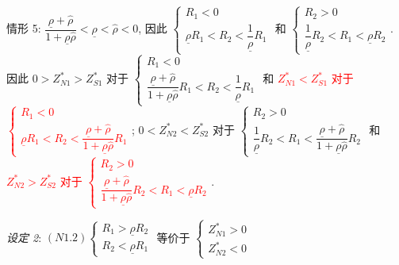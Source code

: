 \documentclass[10.0pt]{article}
\newcommand{\hhred}{\textcolor{red}}
\begin{document}
情形 5: $ \dfrac{\underline{\rho} + {\hat \rho}}{1 + \underline{\rho} {\hat \rho}} < \underline{\rho} < {\hat \rho} < 0 $, 因此 $ \left\{ \begin{matrix} R_1 < 0 \\ \underline{\rho} R_1 < R_2 < \dfrac{1}{\underline{\rho}} R_1 \end{matrix} \right. $ 和 $ \left\{ \begin{matrix} R_2 > 0 \\ \dfrac{1}{\underline{\rho}} R_2 < R_1 < \underline{\rho} R_2 \end{matrix} \right. $.
因此 $ 0 > Z_{N 1}^* > Z_{S 1}^* $ 对于 $ \left\{ \begin{matrix} R_1 < 0 \\ \dfrac{\underline{\rho} + {\hat \rho}}{1 + \underline{\rho} {\hat \rho}} R_1 < R_2 < \dfrac{1}{\underline{\rho}} R_1 \end{matrix} \right. $ 和 \hhred{$ Z_{N 1}^* < Z_{S 1}^* $ 对于 $ \left\{ \begin{matrix} R_1 < 0 \\ \underline{\rho} R_1 < R_2 < \dfrac{\underline{\rho} + {\hat \rho}}{1 + \underline{\rho} {\hat \rho}} R_1 \end{matrix} \right. $}; 
$ 0 < Z_{N 2}^* < Z_{S 2}^* $ 对于 $ \left\{ \begin{matrix} R_2 > 0 \\ \dfrac{1}{\underline{\rho}} R_2 < R_1 < \dfrac{\underline{\rho} + {\hat \rho}}{1 + \underline{\rho} {\hat \rho}} R_2 \end{matrix} \right. $ 和 \hhred{$ Z_{N 2}^* > Z_{S 2}^* $ 对于 $ \left\{ \begin{matrix} R_2 > 0 \\ \dfrac{\underline{\rho} + {\hat \rho}}{1 + \underline{\rho} {\hat \rho}} R_2 < R_1 < \underline{\rho} R_2 \end{matrix} \right. $}.

{\it 设定 2}: $ (N1.2) \left\{ \begin{matrix} R_1 > \underline{\rho} R_2 \\ R_2 < \underline{\rho} R_1 \end{matrix} \right. $  等价于 $ \left\{ \begin{matrix} Z_{N 1}^* > 0 \\ Z_{N 2}^* < 0 \end{matrix} \right. $
\end{document}
